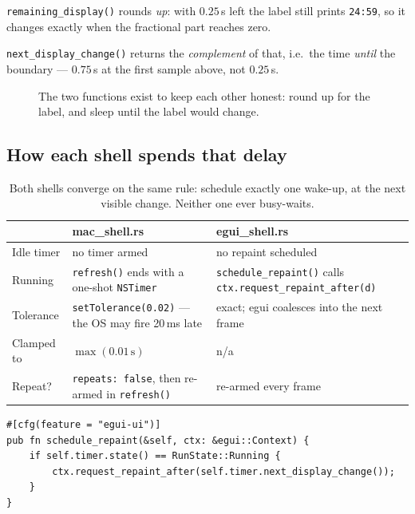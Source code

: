 \begin{center}\small
\begin{minipage}{0.92\linewidth}
\texttt{remaining\_display()} rounds \emph{up}: with $0.25$\,s left the label still
prints \texttt{24:59}, so it changes exactly when the fractional part reaches zero.

\texttt{next\_display\_change()} returns the \emph{complement} of that, i.e.\ the time
\emph{until} the boundary --- $0.75$\,s at the first sample above, not $0.25$\,s.
\end{minipage}
\end{center}

\begin{figure}[H]
\centering
\caption{The two functions exist to keep each other honest: round up for the label, and
sleep until the label would change.}
\label{fig:rounding}
\end{figure}

\subsection{How each shell spends that delay}

\begin{table}[H]
\centering\small
\begin{tabular}{@{}p{30mm} p{66mm} p{62mm}@{}}
\toprule
& \textbf{mac\_shell.rs} & \textbf{egui\_shell.rs} \\
\midrule
Idle timer & no timer armed & no repaint scheduled \\
Running & \texttt{refresh()} ends with a one-shot \texttt{NSTimer} &
\texttt{schedule\_repaint()} calls \texttt{ctx.request\_repaint\_after(d)} \\
Tolerance & \texttt{setTolerance(0.02)} --- the OS may fire 20\,ms late &
exact; egui coalesces into the next frame \\
Clamped to & $\max(0.01\,\text{s})$ & n/a \\
Repeat? & \texttt{repeats: false}, then re-armed in \texttt{refresh()} & re-armed every frame \\
\bottomrule
\end{tabular}
\caption{Both shells converge on the same rule: schedule exactly one wake-up, at the
next visible change. Neither one ever busy-waits.}
\end{table}

\begin{lstlisting}[caption={\file{app.rs} lines 172--176: the whole scheduling policy is
three lines.}]
#[cfg(feature = "egui-ui")]
pub fn schedule_repaint(&self, ctx: &egui::Context) {
    if self.timer.state() == RunState::Running {
        ctx.request_repaint_after(self.timer.next_display_change());
    }
}
\end{lstlisting}

